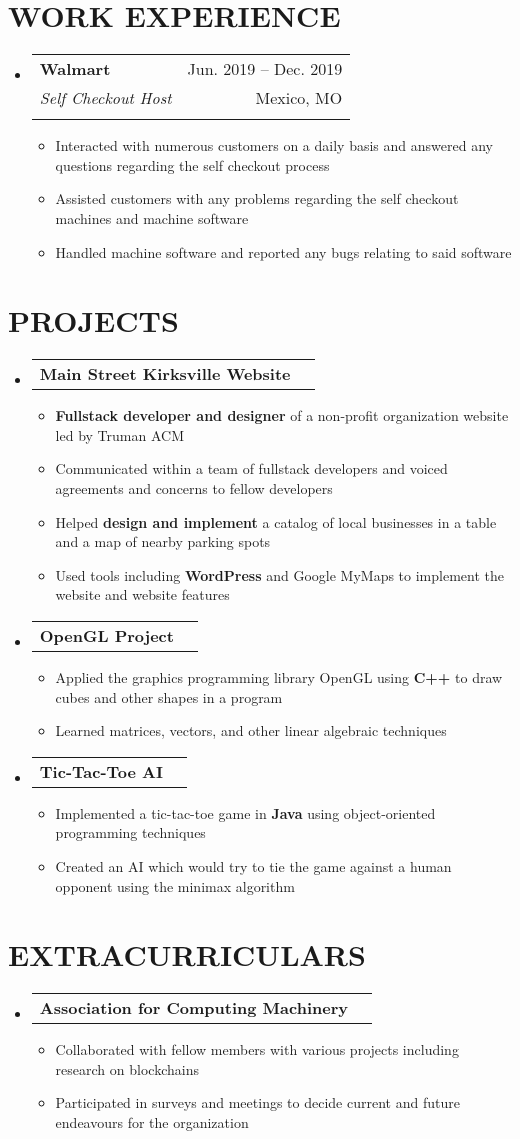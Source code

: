 \documentclass[letterpaper,11pt]{article}
\makeatletter
\newcommand{\resumeItem}[1]{
  \item\small{
    {#1 \vspace{-1pt}}
  }
}
\newcommand{\resumeSubheading}[5]{
  \vspace{-1pt}\item
    \begin{tabular*}{\textwidth}[t]{l@{\extracolsep{\fill}}r}
      \textbf{#1} & {\color{dark-grey}\small #2}\vspace{1pt}\\ %
      \textit{#3} & {\color{dark-grey} \small #4}\vspace{1pt}\\ %
      & \color{dark-grey} \small #5
    \end{tabular*}\vspace{-20pt}
}
\newcommand{\resumeProjectHeading}[2]{
    \item
    \begin{tabular*}{\textwidth}{l@{\extracolsep{\fill}}r}
      #1 & {\color{dark-grey}} \\
    \end{tabular*}\vspace{-7pt}
}
\newcommand{\resumeExtracurricularsHeading}[1]{
    \item
    \begin{tabular*}{\textwidth}{l@{\extracolsep{\fill}}r}
      #1 & {\color{dark-grey}} \\
    \end{tabular*}\vspace{-7pt}
}
\newcommand{\resumeSubHeadingListStart}{\begin{itemize}[leftmargin=0in, label={}]}
\newcommand{\resumeSubHeadingListEnd}{\end{itemize}}
\newcommand{\resumeItemListStart}{\begin{itemize}\setlength{\itemindent}{-1em}}
\newcommand{\resumeItemListEnd}{\end{itemize}\vspace{0pt}}
\makeatother
\begin{document}
\section{WORK EXPERIENCE}
\resumeSubHeadingListStart
\resumeSubheading
{Walmart}{Jun. 2019 -- Dec. 2019}
{Self Checkout Host}{Mexico, MO}
{}
\resumeItemListStart
\resumeItem{Interacted with numerous customers on a daily basis and answered any questions regarding the self checkout process}
\resumeItem{Assisted customers with any problems regarding the self checkout machines and machine software}
\resumeItem{Handled machine software and reported any bugs relating to said software}
\resumeItemListEnd
\resumeSubHeadingListEnd

\section{PROJECTS}
\resumeSubHeadingListStart
\resumeProjectHeading
{\textbf{Main Street Kirksville Website}} {Sept. 2019 -- Mar. 2021}
\resumeItemListStart
\resumeItem{\textbf{Fullstack developer and designer} of a non-profit organization website led by Truman ACM}
\resumeItem{Communicated within a team of fullstack developers and voiced agreements and concerns to fellow developers}
\resumeItem{Helped \textbf{design and implement} a catalog of local businesses in a table and a map of nearby parking spots}
\resumeItem{Used tools including \textbf{WordPress} and Google MyMaps to implement the website and website features}
\resumeItemListEnd
\resumeSubHeadingListEnd

\resumeSubHeadingListStart
\resumeProjectHeading
{\textbf{OpenGL Project}} {Sept. 2019 -- Mar. 2021}
\resumeItemListStart
\resumeItem{Applied the graphics programming library OpenGL using \textbf{C++} to draw cubes and other shapes in a program}
\resumeItem{Learned matrices, vectors, and other linear algebraic techniques}
\resumeItemListEnd
\resumeSubHeadingListEnd

\resumeSubHeadingListStart
\resumeProjectHeading
{\textbf{Tic-Tac-Toe AI}} {Sept. 2019 -- Mar. 2021}
\resumeItemListStart
\resumeItem{Implemented a tic-tac-toe game in \textbf{Java} using object-oriented programming techniques}
\resumeItem{Created an AI which would try to tie the game against a human opponent using the minimax algorithm}
\resumeItemListEnd
\resumeSubHeadingListEnd


\section{EXTRACURRICULARS}
\resumeSubHeadingListStart
\resumeExtracurricularsHeading
{\textbf{Association for Computing Machinery}}
\resumeItemListStart
\resumeItem{Collaborated with fellow members with various projects including research on blockchains}
\resumeItem{Participated in surveys and meetings to decide current and future endeavours for the organization}
\resumeItemListEnd
\resumeSubHeadingListEnd
\end{document}
